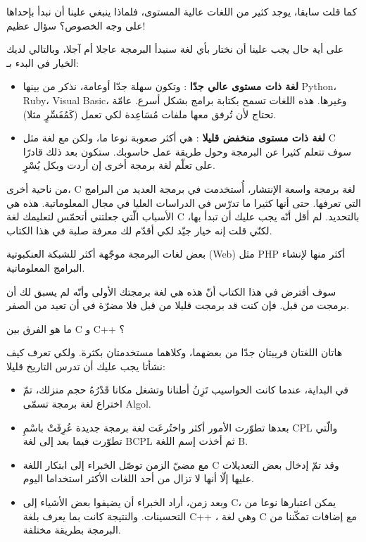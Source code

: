  كما قلت سابقا، يوجد كثير من اللغات عالية المستوى، فلماذا ينبغي علينا أن نبدأ بإحداها على وجه الخصوص؟ سؤال عظيم!

على أية حال يجب علينا أن نختار بأي لغة سنبدأ البرمجة عاجلا أم آجلا، وبالتالي لديك الخيار في البدء بـ:

\begin{itemize}
  \item \textbf{لغة ذات مستوى عالي جدّا} :
 وتكون سهلة جدّا أوعامة، نذكر من بينها
 \textenglish{Python}، \textenglish{Ruby}، \textenglish{Visual Basic}،
 وغيرها. هذه اللغات تسمح بكتابة برامج بشكل أسرع. عامّة تحتاج لأن تُرفق معها ملفات مُسَاعِدة لكي تعمل (كَمُفَسِّرٍ مثلا).
  \item \textbf{لغة ذات مستوى منخفض قليلا} :
هي أكثر صعوبة نوعا ما، ولكن مع لغة مثل
\textenglish{C}
 سوف تتعلم كثيرا عن البرمجة وحول طريقة عمل حاسوبك. ستكون بعد ذلك قادرًا على تعلّم لغة برمجة أخرى إن أردت وبكل يُسْرٍ.
\end{itemize}

من ناحية أخرى،
\textenglish{C}
لغة برمجة واسعة الإنتشار، أُستخدمت في برمجة العديد من البرامج التي تعرفها. حتى أنها كثيرا ما تدرّس في الدراسات العليا في مجال المعلوماتية.
هذه هي الأسباب الّتي جعلتني أتحمّس لتعليمك لغة
\textenglish{C}
بالتحديد. لم أقل أنّه يجب عليك أن تبدأ بها، لكنّي قلت إنه خيار جيّد لكي أقدّم لك معرفة صلبة في هذا الكتاب.

\begin{information}
  بعض لغات البرمجة موجّهة أكثر للشبكة العنكبوتية
 (\textenglish{Web})
 مثل
 \textenglish{PHP}
 أكثر منها لإنشاء البرامج المعلوماتية.
\end{information}

سوف أفترض في هذا الكتاب أنّ هذه هي لغة برمجتك الأولى وأنّه لم يسبق لك أن برمجت من قبل. فإن كنت قد برمجت قليلا من قبل فلا مضرّة في أن تعيد من الصفر.

\begin{question}
  ما هو الفرق بين
  \textenglish{C}
  و
  \textenglish{C++}
  ؟
\end{question}

هاتان اللغتان قريبتان جدّا من بعضهما، وكلاهما مستخدمتان بكثرة. ولكي تعرف كيف نشأتا يجب عليك أن تدرس التاريخ قليلا:
\begin{itemize}
  \item في البداية، عندما كانت الحواسيب تَزِنُ أطنانا وتشغل مكانا قَدْرُهُ حجم منزلك، تمّ اختراع لغة برمجة تسمّى
\textenglish{Algol}.
  \item بعدها تطوّرت الأمور أكثر واختُرعَت لغة برمجة جديدة عُرِفَتْ باسْمِ
\textenglish{CPL}
 والّتي تطوّرت فيما بعد إلى لغة
\textenglish{BCPL}
 ثم أخذت إسم اللغة
\textenglish{B}.
  \item مع مضيّ الزمن توصّل الخبراء إلى ابتكار اللغة
\textenglish{C}
 وقد تمّ إدخال بعض التعديلات عليها إلّا أنها لا تزال من أحد اللغات الأكثر استخداما اليوم.
  \item وبعد زمن، أراد الخبراء أن يضيفوا بعض الأشياء إلى
\textenglish{C}،
يمكن اعتبارها نوعا من التحسينات. والنتيجة كانت بما يعرف بلغة
\textenglish{C++}
، وهي لغة
\textenglish{C}
 مع إضافات تمكّننا من البرمجة بطريقة مختلفة.
\end{itemize}

